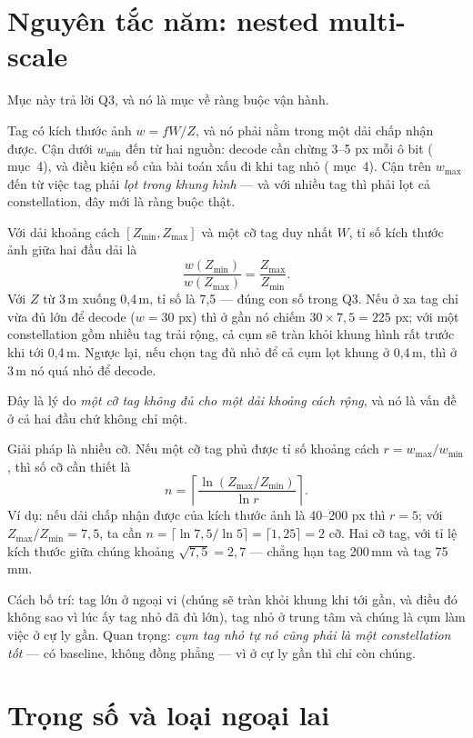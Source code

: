 \documentclass[../../marker.tex]{subfiles}
\begin{document}
\section{Nguyên tắc năm: nested multi-scale}

Mục này trả lời Q3, và nó là mục về ràng buộc vận hành.

Tag có kích thước ảnh \(w = fW/Z\), và nó phải nằm trong một dải chấp nhận được. Cận dưới \(w_{\min}\) đến từ hai nguồn: decode cần chừng 3--5 px mỗi ô bit ( mục~4), và điều kiện số của bài toán xấu đi khi tag nhỏ ( mục~4). Cận trên \(w_{\max}\) đến từ việc tag phải \emph{lọt trong khung hình} --- và với nhiều tag thì phải lọt cả constellation, đây mới là ràng buộc thật.

Với dải khoảng cách \([Z_{\min}, Z_{\max}]\) và một cỡ tag duy nhất \(W\), tỉ số kích thước ảnh giữa hai đầu dải là
\[
\frac{w(Z_{\min})}{w(Z_{\max})} = \frac{Z_{\max}}{Z_{\min}}.
\]
Với \(Z\) từ 3\,m xuống 0,4\,m, tỉ số là 7,5 --- đúng con số trong Q3. Nếu ở xa tag chỉ vừa đủ lớn để decode (\(w = 30\) px) thì ở gần nó chiếm \(30 \times 7{,}5 = 225\) px; với một constellation gồm nhiều tag trải rộng, cả cụm sẽ tràn khỏi khung hình rất trước khi tới 0,4\,m. Ngược lại, nếu chọn tag đủ nhỏ để cả cụm lọt khung ở 0,4\,m, thì ở 3\,m nó quá nhỏ để decode.

Đây là lý do \emph{một cỡ tag không đủ cho một dải khoảng cách rộng}, và nó là vấn đề ở cả hai đầu chứ không chỉ một.

Giải pháp là nhiều cỡ. Nếu một cỡ tag phủ được tỉ số khoảng cách \(r = w_{\max}/w_{\min}\), thì số cỡ cần thiết là
\[
n = \left\lceil \frac{\ln(Z_{\max}/Z_{\min})}{\ln r} \right\rceil .
\]
Ví dụ: nếu dải chấp nhận được của kích thước ảnh là 40--200 px thì \(r = 5\); với \(Z_{\max}/Z_{\min} = 7{,}5\), ta cần \(n = \lceil \ln 7{,}5/\ln 5\rceil = \lceil 1{,}25 \rceil = 2\) cỡ. Hai cỡ tag, với tỉ lệ kích thước giữa chúng khoảng \(\sqrt{7{,}5} = 2{,}7\) --- chẳng hạn tag 200\,mm và tag 75\,mm.

Cách bố trí: tag lớn ở ngoại vi (chúng sẽ tràn khỏi khung khi tới gần, và điều đó không sao vì lúc ấy tag nhỏ đã đủ lớn), tag nhỏ ở trung tâm và chúng là cụm làm việc ở cự ly gần. Quan trọng: \emph{cụm tag nhỏ tự nó cũng phải là một constellation tốt} --- có baseline, không đồng phẳng --- vì ở cự ly gần thì chỉ còn chúng.

\section{Trọng số và loại ngoại lai}
\end{document}
